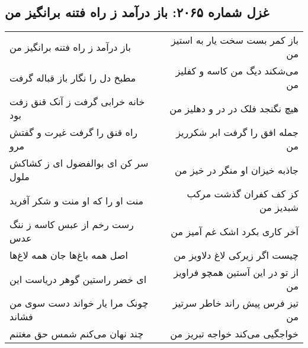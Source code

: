 \begin{center}
\section*{غزل شماره ۲۰۶۵: باز درآمد ز راه فتنه برانگیز من}
\label{sec:2065}
\begin{longtable}{l p{0.5cm} r}
باز درآمد ز راه فتنه برانگیز من
&&
باز کمر بست سخت یار به استیز من
\\
مطبخ دل را نگار باز قباله گرفت
&&
می‌شکند دیگ من کاسه و کفلیز من
\\
خانه خرابی گرفت ز آنک قنق زفت بود
&&
هیچ نگنجد فلک در در و دهلیز من
\\
راه قنق را گرفت غیرت و گفتش مرو
&&
جمله افق را گرفت ابر شکرریز من
\\
سر کن ای بوالفضول ای ز کشاکش ملول
&&
جاذبه خیزان او منگر در خیز من
\\
منت او را که او منت و شکر آفرید
&&
کز کف کفران گذشت مرکب شبدیز من
\\
رست رخم از عبس کاسه ز ننگ عدس
&&
آخر کاری بکرد اشک غم آمیز من
\\
اصل همه باغ‌ها جان همه لاغ‌ها
&&
چیست اگر زیرکی لاغ دلاویز من
\\
ای خضر راستین گوهر دریاست این
&&
از تو در این آستین همچو فراویز من
\\
چونک مرا یار خواند دست سوی من فشاند
&&
تیز فرس پیش راند خاطر سرتیز من
\\
چند نهان می‌کنم شمس حق مغتنم
&&
خواجگیی می‌کند خواجه تبریز من
\\
\end{longtable}
\end{center}
